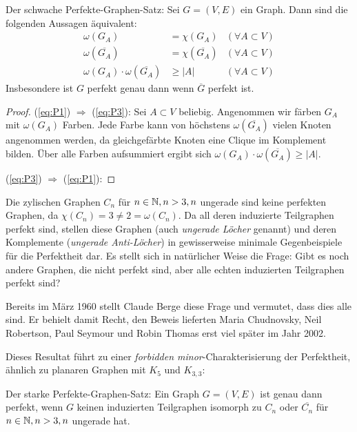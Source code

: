 \documentclass[../main.tex]{subfiles}
\begin{document}
\begin{satz}
    Der schwache Perfekte-Graphen-Satz: Sei $G = (V, E)$ ein Graph. Dann sind die folgenden Aussagen äquivalent:
    \begin{align}
        \omega(G_A) &= \chi(G_A) &(\forall A \subset V) \tag{P1}\label{eq:P1}\\
        \omega(\overline{G_A}) &= \chi(\overline{G_A}) &(\forall A \subset V) \tag{P2}\label{eq:P2}\\
        \omega(G_A) \cdot \omega(\overline{G_A}) &\geq |A| &(\forall A \subset V) \tag{P3}\label{eq:P3}
    \end{align}
    Insbesondere ist $G$ perfekt genau dann wenn $\overline G$ perfekt ist.
\end{satz}
\begin{proof}
    (\ref{eq:P1}) $\Rightarrow$ (\ref{eq:P3}): Sei $A \subset V$ beliebig. Angenommen wir färben $G_A$ mit $\omega(G_A)$ Farben. Jede Farbe kann von höchstens $\omega(\overline{G_A})$ vielen Knoten angenommen werden, da gleichgefärbte Knoten eine Clique im Komplement bilden. Über alle Farben aufsummiert ergibt sich $\omega(G_A) \cdot \omega(\overline{G_A}) \geq |A|$.

    (\ref{eq:P3}) $\Rightarrow$ (\ref{eq:P1}): 
\end{proof}

Die zylischen Graphen $C_n$ für $n \in \mathbb{N}, n > 3, n$ ungerade sind keine perfekten Graphen, da $\chi(C_n) = 3 \neq 2 = \omega(C_n)$. Da all deren induzierte Teilgraphen perfekt sind, stellen diese Graphen (auch \emph{ungerade Löcher} genannt) und deren Komplemente (\emph{ungerade Anti-Löcher}) in gewisserweise minimale Gegenbeispiele für die Perfektheit dar. Es stellt sich in natürlicher Weise die Frage: Gibt es noch andere Graphen, die nicht perfekt sind, aber alle echten induzierten Teilgraphen perfekt sind?

Bereits im März 1960 stellt Claude Berge diese Frage und vermutet, dass dies alle sind.\cite{das_Buch} Er behielt damit Recht, den Beweis lieferten Maria Chudnovsky, Neil Robertson, Paul Seymour und Robin Thomas\cite{chudnovsky2002strongperfectgraphtheorem} erst viel später im Jahr 2002.

Dieses Resultat führt zu einer \emph{forbidden minor}-Charakterisierung der Perfektheit, ähnlich zu planaren Graphen mit $K_5$ und $K_{3,3}$:

\begin{satz}
    Der starke Perfekte-Graphen-Satz: Ein Graph $G = (V, E)$ ist genau dann perfekt, wenn $G$ keinen induzierten Teilgraphen isomorph zu $C_n$ oder $\overline{C_n}$ für $n \in \mathbb{N}, n > 3, n$ ungerade hat.
\end{satz}


\end{document}
